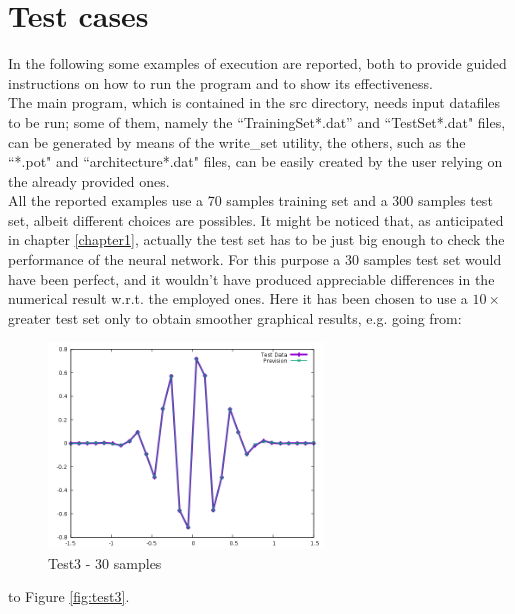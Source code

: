 \documentclass[12pt, a4paper]{report}
\theoremstyle{definition}
\begin{document}
\section{Test cases}
In the following some examples of execution are reported, both to provide guided instructions on how to run the program and to show its effectiveness.\\
The main program, which is contained in the {\ttfamily src} directory, needs input datafiles to be run; some of them, namely the ``TrainingSet*.dat'' and ``TestSet*.dat" files, can be generated by means of the write\_set utility, the others, such as the ``*.pot" and ``architecture*.dat" files, can be easily created by the user relying on the already provided ones.\\
All the reported examples use a 70 samples training set and a 300 samples test set, albeit different choices are possibles. It might be noticed that, as anticipated in chapter \ref{chapter1}, actually the test set has to be just big enough to check the performance of the neural network. For this purpose a 30 samples test set would have been perfect, and it wouldn't have produced appreciable differences in the numerical result w.r.t. the employed ones. Here it has been chosen to use a $10\times$ greater test set only to obtain smoother graphical results, e.g. going from:
\begin{figure}[H]
	\centering
	\includegraphics[width=0.65\textwidth]{img/Prevision30} 
	\caption{Test3 - 30 samples}
\end{figure}
\noindent to Figure \ref{fig:test3}.
\end{document}
